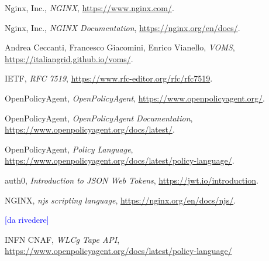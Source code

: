 \begin{thebibliography}{99}

	Nginx, Inc.,
	\textit{NGINX},
	\url{https://www.nginx.com/}.

	Nginx, Inc.,
	\textit{NGINX Documentation},
	\url{https://nginx.org/en/docs/}.

	Andrea Ceccanti, Francesco Giacomini, Enrico Vianello,
	\textit{VOMS},
	\url{https://italiangrid.github.io/voms/}.

	IETF,
	\textit{RFC 7519},
	\url{https://www.rfc-editor.org/rfc/rfc7519}.

	OpenPolicyAgent,
	\textit{OpenPolicyAgent},
	\url{https://www.openpolicyagent.org/}.

	OpenPolicyAgent,
	\textit{OpenPolicyAgent Documentation},
	\url{https://www.openpolicyagent.org/docs/latest/}.

	OpenPolicyAgent,
	\textit{Policy Language},
	\url{https://www.openpolicyagent.org/docs/latest/policy-language/}.

	auth0, \textit{Introduction to JSON Web Tokens},
	\url{https://jwt.io/introduction}. 

	NGINX,
	\textit{njs scripting language},
	\url{https://nginx.org/en/docs/njs/}.

	\textcolor{blue}{[da rivedere]}
    
	INFN CNAF,
	\textit{WLCg Tape API},
	\url{https://www.openpolicyagent.org/docs/latest/policy-language/}

\end{thebibliography}
